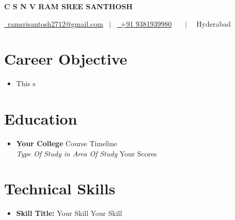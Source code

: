 \documentclass[letterpaper,5pt]{article}
\begin{document}
    
    \begin{center}
      \textbf{\Huge \scshape C S N V RAM SREE SANTHOSH} \\ \vspace{5pt}
      
      \href{mailto:ramsrisantosh2712@gmail.com}{\raisebox{-0.05\height}\faEnvelope \ ramsrisantosh2712@gmail.com} 
      \ $|$ \ \href{tel:+91 9381939980}{\raisebox{-0.05\height}\faMobile \ +91 9381939980}  \
       \
      \ $|$ \ {\raisebox{-0.05\height}\faMapMarker \ Hyderabad} \ \
    \end{center}
    
      \section{Career Objective}
        \begin{itemize}[leftmargin=0.15in, label={}]
          \item{This s}
        \end{itemize}
    
    \section{Education}
      
        \begin{itemize}[leftmargin=0.15in, label={}]
        \item[]
            \textbf{Your College} \hfill Course Timeline \\
            \textit{Type Of Study in Area Of Study} \hfill Your Scores
        \end{itemize}
      
      

    
    \section{Technical Skills}
    
        \begin{itemize}[leftmargin=0.15in,label={}]
        \item{
          \textbf{Skill Title: }{\textbullet{} Your Skill \textbullet{} Your Skill \newline}
        }
        \end{itemize}
        \vspace*{-6mm}  
        
\end{document}
